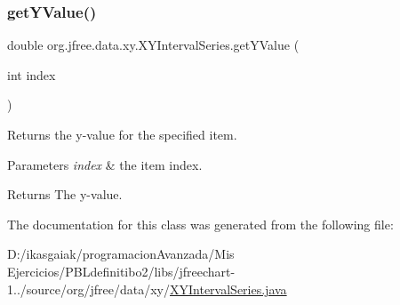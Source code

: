\subsubsection{\texorpdfstring{get\+Y\+Value()}{getYValue()}}
{\footnotesize\ttfamily double org.\+jfree.\+data.\+xy.\+X\+Y\+Interval\+Series.\+get\+Y\+Value (\begin{DoxyParamCaption}\item[{int}]{index }\end{DoxyParamCaption})}

Returns the y-\/value for the specified item.


\begin{DoxyParams}{Parameters}
{\em index} & the item index.\\
\hline
\end{DoxyParams}
\begin{DoxyReturn}{Returns}
The y-\/value. 
\end{DoxyReturn}


The documentation for this class was generated from the following file\+:\begin{DoxyCompactItemize}
\item 
D\+:/ikasgaiak/programacion\+Avanzada/\+Mis Ejercicios/\+P\+B\+Ldefinitibo2/libs/jfreechart-\/1../source/org/jfree/data/xy/\mbox{\hyperlink{_x_y_interval_series_8java}{X\+Y\+Interval\+Series.\+java}}\end{DoxyCompactItemize}
